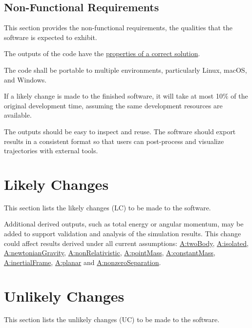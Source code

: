 \documentclass[12pt]{article}
\begin{document}
\subsection{Non-Functional Requirements}
\label{Sec:NFRs}
This section provides the non-functional requirements, the qualities that the software is expected to exhibit.

\begin{description}[font=\normalfont]
\item[Correctness:\phantomsection\label{correct}]{The outputs of the code have the \hyperref[Sec:CorSolProps]{properties of a correct solution}.}
\item[Portability:\phantomsection\label{portable}]{The code shall be portable to multiple environments, particularly Linux, macOS, and Windows.}
\item[Maintainability:\phantomsection\label{maintainable}]{If a likely change is made to the finished software, it will take at most 10$\%$ of the original development time, assuming the same development resources are available.}
\item[Usability:\phantomsection\label{usable}]{The outputs should be easy to inspect and reuse. The software should export results in a consistent format so that users can post-process and visualize trajectories with external tools.}
\end{description}
\section{Likely Changes}
\label{Sec:LCs}
This section lists the likely changes (LC) to be made to the software.

\begin{description}[font=\normalfont]
\item[Derived-Output-Quantities:\phantomsection\label{lcDerivedOutputs}]{Additional derived outputs, such as total energy or angular momentum, may be added to support validation and analysis of the simulation results. This change could affect results derived under all current assumptions: \hyperref[twoBody]{A:twoBody}, \hyperref[isolated]{A:isolated}, \hyperref[newtonianGravity]{A:newtonianGravity}, \hyperref[nonRelativistic]{A:nonRelativistic}, \hyperref[pointMass]{A:pointMass}, \hyperref[constantMass]{A:constantMass}, \hyperref[inertialFrame]{A:inertialFrame}, \hyperref[planar]{A:planar} and \hyperref[nonzeroSeparation]{A:nonzeroSeparation}.}
\end{description}
\section{Unlikely Changes}
\label{Sec:UCs}
This section lists the unlikely changes (UC) to be made to the software.
\end{document}
